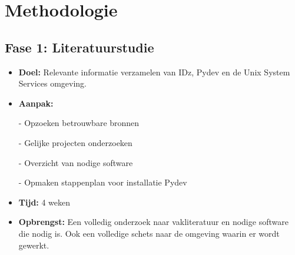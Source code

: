 
\chapter{Methodologie}%
\label{ch:methodologie}


\section{Fase 1: Literatuurstudie}
\label{sec:m-literatuurstudie}
\begin{itemize}
    \item \textbf{Doel:}
    Relevante informatie verzamelen van IDz, Pydev en de Unix System Services omgeving.
    \item \textbf{Aanpak:}
    \item[-] Opzoeken betrouwbare bronnen
    \item[-] Gelijke projecten onderzoeken
    \item[-] Overzicht van nodige software
    \item[-] Opmaken stappenplan voor installatie Pydev
    \item \textbf{Tijd:} 4 weken
    \item \textbf{Opbrengst:}
    Een volledig onderzoek naar vakliteratuur en nodige software die nodig is. Ook een volledige schets naar de omgeving waarin er wordt gewerkt.
\end{itemize}


